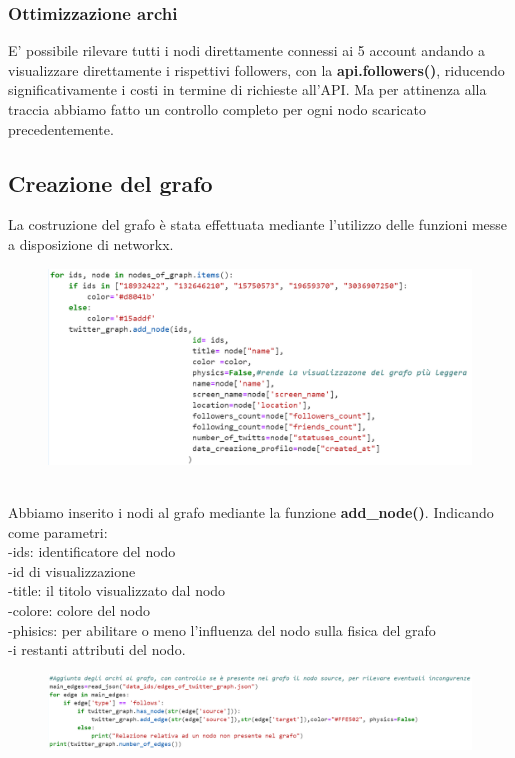 \documentclass[a4paper,11pt]{report}
\begin{document}
\subsubsection{Ottimizzazione archi}
E' possibile rilevare tutti i nodi direttamente connessi ai 5 account andando a visualizzare direttamente i rispettivi followers, con la \textbf{api.followers()}, riducendo significativamente i costi in termine di richieste all'API. Ma per attinenza alla traccia abbiamo fatto un controllo completo per ogni nodo scaricato precedentemente.
\subsection{Creazione del grafo}
La costruzione del grafo è stata effettuata mediante l'utilizzo delle funzioni messe a disposizione di networkx. 
\begin{figure}[h]
	\centering
	\includegraphics[width=0.7\linewidth]{aggiunta_nodi}
	\label{fig:aggiuntanodi}
\end{figure}
\\
Abbiamo inserito i nodi al grafo mediante la funzione \textbf{add\_node()}. Indicando come parametri:\\
-ids: identificatore del nodo\\
-id di visualizzazione\\
-title: il titolo visualizzato dal nodo\\
-colore: colore del nodo\\
-phisics: per abilitare o meno l'influenza del nodo sulla fisica del grafo\\
-i restanti attributi del nodo.
\newline

\begin{figure}[h]
	\centering
	\includegraphics[width=0.8\linewidth]{aggiunta_archi}
	\label{fig:aggiuntaarchi}
\end{figure}
\end{document}
